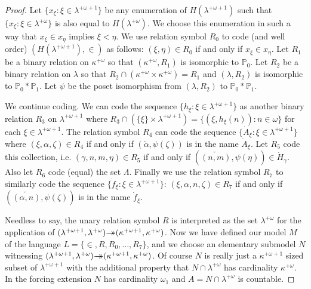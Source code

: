 \documentclass{rmmcart}
\theoremstyle{plain}
\theoremstyle{definition}
\theoremstyle{remark}
\theoremstyle{plain}
\theoremstyle{definition}
\theoremstyle{remark}
\begin{document}
\begin{proof}
            Let $\{ x_\xi : \xi\in \lambda^{+\omega+1}\}$ be any enumeration of
             $H(\lambda^{+\omega+1})$  such that
             $\{ x_\xi : \xi\in \lambda^{+\omega}\}$ is also equal to
             $H(\lambda^{+\omega})$. We choose this enumeration in such a way that
             $x_\xi\in x_\eta$ implies $\xi<\eta$.
            We use relation symbol $R_0$ to code
            (and well order)
             $(H(\lambda^{+\omega+1}), \in)$ as follows: $(\xi,\eta)\in R_0$
            if and only if $x_\xi\in x_\eta$.
            Let $R_1$ be a binary relation on $\kappa^{+\omega}$ so that
            $(\kappa^{+\omega},R_1)$ is isomorphic to $\mathbb P_0$. Let
             $R_2$ be a binary relation on $\lambda$ so that
             $R_2\cap (\kappa^{+\omega}\times \kappa^{+\omega})=R_1$ and
             $(\lambda,R_2)$ is isomorphic to $\mathbb P_0*\mathbb P_1$.
            Let $\psi$ be the poset isomorphism from $(\lambda,R_2)$ to
             $\mathbb P_0*\mathbb P_1$.

            We continue coding. We can code the sequence
             $\{ h_\xi : \xi\in \lambda^{+\omega+1}\}$ as another binary  relation
             $R_3$ on $\lambda^{+\omega+1}$ where $R_3\cap \left(\{\xi\}\times
             \lambda^{+\omega+1}\right) = \{ (\xi,h_\xi(n) ) : n\in \omega\}$
            for each $\xi\in \lambda^{+\omega+1}$. The relation symbol $R_4$ can
            code the sequence $\{ \dot A_\xi : \xi \in \lambda^{+\omega+1}\}$
            where $(\xi, \alpha, \zeta) \in R_4$ if and only if
            $(\check \alpha, \psi(\zeta))$ is in the name $\dot A_\xi$.
             Let $R_5$ code this collection, i.e.
             $(\gamma,n,m,\eta)\in R_5$ if and only if
             $(\check{(n,m)}, \psi(\eta))\in \dot H_\gamma$. Also let $R_6$ code
             (equal)  the set $\Lambda$.
            Finally we use the relation symbol $R_7$ to similarly code the
            sequence $\{ \dot f_\xi  : \xi \in \lambda^{+\omega+1}\}$:
             $(\xi, \alpha, n, \zeta) \in R_7$ if and only if
            $(\check {(\alpha,n)}, \psi(\zeta))$ is in the name $\dot f_\xi$.

            Needless to say, the unary relation symbol $R$
            is interpreted as the set $\lambda^{+\omega}$ for the application of
            $(\lambda^{+\omega+1},\lambda^{+\omega})\rlap{$\rightarrow$}\,{\rightarrow}
            (\kappa^{+\omega+1},\kappa^{+\omega})$.
             Now  we have defined our model
            $M$  of the language $L= \{\in, R, R_0,\ldots, R_7\}$,
             and we choose an elementary submodel
            $N$ witnessing
            $(\lambda^{+\omega+1},\lambda^{+\omega})\rlap{$\rightarrow$}\,{\rightarrow}
            (\kappa^{+\omega+1},\kappa^{+\omega})$. Of course $N$ is really just
            a $\kappa^{+\omega+1}$ sized subset of $\lambda^{+\omega+1}$
            with the additional property that $N\cap \lambda^{+\omega}$ has
            cardinality $\kappa^{+\omega}$.  In the
            forcing extension $N$ has cardinality $\omega_1$ and
             $A= N\cap \lambda^{+\omega}$ is countable.


\end{proof}
\end{document}
